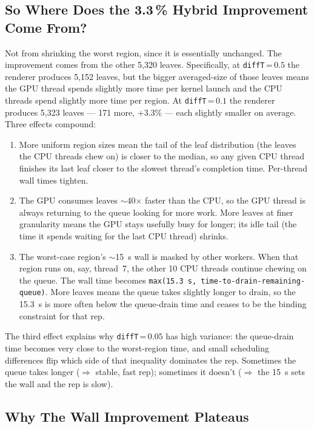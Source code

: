 \documentclass[
	english,
	letterpaper, oneside
]{article}
\begin{document}
\subsection{So Where Does the 3.3\,\% Hybrid Improvement Come From?}

Not from shrinking the worst region, since it is essentially
unchanged. The improvement comes from the other 5{,}320 leaves.
Specifically, at \texttt{diffT}\,=\,$0.5$ the renderer produces 5{,}152
leaves, but the bigger averaged-size of those leaves means the GPU
thread spends slightly more time per kernel launch and the CPU threads
spend slightly more time per region. At \texttt{diffT}\,=\,$0.1$ the
renderer produces 5{,}323 leaves --- 171 more, $+3.3\%$ --- each
slightly smaller on average. Three effects compound:

\begin{enumerate}
    \item More uniform region sizes mean the tail of the leaf
    distribution (the leaves the CPU threads chew on) is closer to
    the median, so any given CPU thread finishes its last leaf closer
    to the slowest thread's completion time. Per-thread wall times
    tighten.
    \item The GPU consumes leaves $\sim$40$\times$ faster than
    the CPU, so the GPU thread is always returning to the queue
    looking for more work. More leaves at finer granularity means the
    GPU stays usefully busy for longer; its idle tail (the time it
    spends waiting for the last CPU thread) shrinks.
    \item The worst-case region's $\sim$15~s wall is masked by
    other workers. When that region runs on, say, thread~7, the
    other 10 CPU threads continue chewing on the queue. The wall time
    becomes \texttt{max(15.3~s,~time-to-drain-remaining-queue)}. More
    leaves means the queue takes slightly longer to drain, so the
    15.3~s is more often below the queue-drain time and ceases
    to be the binding constraint for that rep.
\end{enumerate}

\noindent
The third effect explains why \texttt{diffT}\,=\,$0.05$ has high
variance: the queue-drain time becomes very close to the worst-region
time, and small scheduling differences flip which side of that
inequality dominates the rep. Sometimes the queue takes longer
($\Rightarrow$ stable, fast rep); sometimes it doesn't
($\Rightarrow$ the 15~s sets the wall and the rep is slow).

\subsection{Why The Wall Improvement Plateaus}
\end{document}
